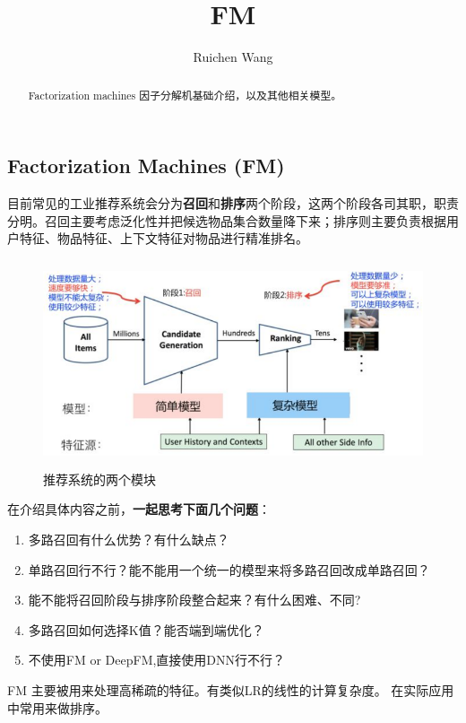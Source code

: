 \documentclass{article}
\author{Ruichen Wang}
\title{FM}
\begin{document}
\begin{CJK*}{UTF8}{gbsn}

\maketitle
\begin{abstract}
Factorization machines 因子分解机基础介绍，以及其他相关模型。
\end{abstract}

\tableofcontents

\section{Factorization Machines (FM)}
目前常见的工业推荐系统会分为\textbf{召回}和\textbf{排序}两个阶段，这两个阶段各司其职，职责分明。召回主要考虑泛化性并把候选物品集合数量降下来；排序则主要负责根据用户特征、物品特征、上下文特征对物品进行精准排名。

\begin{figure}[H]
\centering
\includegraphics[width=4.8in,height=2.4in]{recsys}
\caption{推荐系统的两个模块}
\end{figure}

在介绍具体内容之前，\textbf{一起思考下面几个问题}：
\begin{enumerate}
\item{多路召回有什么优势？有什么缺点？}
\item{单路召回行不行？能不能用一个统一的模型来将多路召回改成单路召回？}
\item{能不能将召回阶段与排序阶段整合起来？有什么困难、不同?}
\item{多路召回如何选择K值？能否端到端优化？}
\item{不使用FM or DeepFM,直接使用DNN行不行？}
\end{enumerate}


FM \cite{DBLP:conf/icdm/Rendle10} 主要被用来处理高稀疏的特征。有类似LR的线性的计算复杂度。 在实际应用中常用来做排序。


\end{CJK*}
\end{document}
